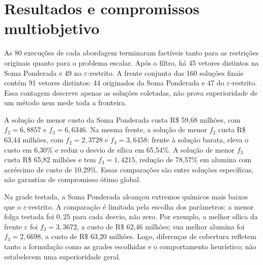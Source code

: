 \documentclass[10pt,twocolumn,a4paper]{article}
\begin{document}
\section{Resultados e compromissos multiobjetivo}

As 80 execuções de cada abordagem terminaram factíveis tanto para as restrições originais quanto para o problema escalar. Após o filtro, há 45 vetores distintos na Soma Ponderada e 49 no $\varepsilon$-restrito. A frente conjunta das 160 soluções finais contém 91 vetores distintos: 44 originados da Soma Ponderada e 47 do $\varepsilon$-restrito. Essa contagem descreve apenas as soluções coletadas, não prova superioridade de um método nem mede toda a fronteira.

\begin{table}[H]
\centering
\caption{Intervalos observados nas frentes não dominadas por abordagem. Custo em milhões de reais. Os extremos de colunas distintas não necessariamente pertencem à mesma solução.}
\label{tab:intervalos_multi}
\end{table}

A solução de menor custo da Soma Ponderada custa R\$ 59,68 milhões, com $f_2=6{,}8857$ e $f_3=6{,}6346$. Na mesma frente, a solução de menor $f_2$ custa R\$ 63,44 milhões, com $f_2=2{,}3728$ e $f_3=3{,}6458$: frente à solução barata, eleva o custo em 6,30\% e reduz o desvio de sílica em 65,54\%. A solução de menor $f_3$ custa R\$ 65,82 milhões e tem $f_3=1{,}4215$, redução de 78,57\% em alumina com acréscimo de custo de 10,29\%. Essas comparações são entre soluções específicas, não garantias de compromisso ótimo global.

Na grade testada, a Soma Ponderada alcançou extremos químicos mais baixos que o $\varepsilon$-restrito. A comparação é limitada pela escolha dos parâmetros: a menor folga testada foi $0{,}25$ para cada desvio, não zero. Por exemplo, a melhor sílica da frente $\varepsilon$ foi $f_2=3{,}3672$, a custo de R\$ 62,46 milhões; sua melhor alumina foi $f_3=2{,}6698$, a custo de R\$ 63,20 milhões. Logo, diferenças de cobertura refletem tanto a formulação como as grades escolhidas e o comportamento heurístico; não estabelecem uma superioridade geral.
\end{document}
